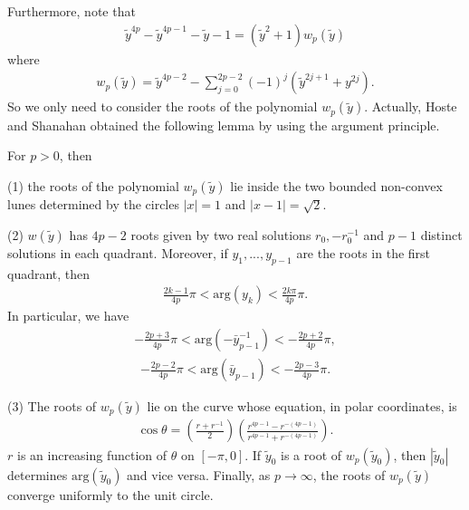 \documentclass[12pt]{amsart}
\begin{document}
Furthermore, note that
\begin{align}
   \tilde{y}^{4p}-\tilde{y}^{4p-1}-\tilde{y}-1=(\tilde{y}^2+1)w_p(\tilde{y})
\end{align}
where 
\begin{align} 
    w_p(\tilde{y})=\tilde{y}^{4p-2}-\sum_{j=0}^{2p-2}(-1)^j(\tilde{y}^{2j+1}+y^{2j}). 
\end{align}
 So we only need to consider the roots of the polynomial $w_p(\tilde{y})$.  Actually, Hoste and Shanahan \cite{HS01} obtained the following lemma by using the argument principle. 
\begin{lemma} \label{lemma-HS}
For $p>0$, then 

(1) the roots of the polynomial $w_p(\tilde{y})$ lie inside the two bounded non-convex lunes determined by the circles $|x|=1$ and $|x-1|=\sqrt{2}$.  

(2) $w(\tilde{y})$ has $4p-2$ roots given by two real solutions $r_0,-r_0^{-1}$ and $p-1$ distinct solutions in each quadrant. Moreover, if $y_1,...,y_{p-1}$ are the roots in the first quadrant, then 
\begin{align}
    \frac{2k-1}{4p}\pi<\text{arg}(y_{k})<\frac{2k\pi}{4p}\pi. 
\end{align}
In particular, we have
\begin{align}
     -\frac{2p+3}{4p}\pi<\text{arg}(-\bar{y}_{p-1}^{-1})<-\frac{2p+2}{4p}\pi,
\end{align}
\begin{align} \label{formula-ybarp}
   -\frac{2p-2}{4p}\pi<\text{arg}(\bar{y}_{p-1})<-\frac{2p-3}{4p}\pi. 
\end{align}

(3) The roots of $w_p(\tilde{y})$ lie on the curve whose equation, in polar coordinates, is 
\begin{align}
\cos \theta=\left(\frac{r+r^{-1}}{2}\right)\left(\frac{r^{4p-1}-r^{-(4p-1)}}{r^{4p-1}+r^{-(4p-1)}}\right).    
\end{align}
$r$ is an increasing function of $\theta$ on $[-\pi,0]$. If $\tilde{y}_0$ is a root of $w_p(\tilde{y}_0)$, then $|\tilde{y}_0|$ determines $\text{arg}(\tilde{y}_0)$ and vice versa. Finally, as $p\rightarrow \infty$, the roots of $w_p(\tilde{y})$ converge uniformly to the unit circle. 
\end{lemma}
\end{document}
